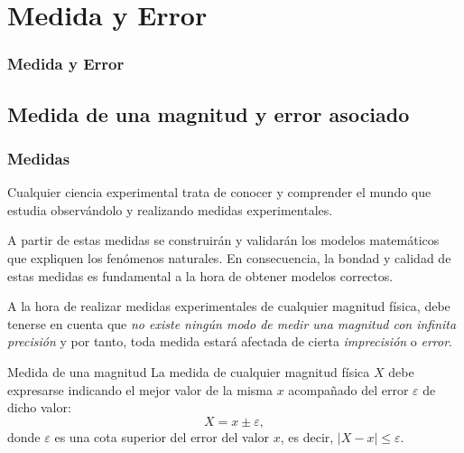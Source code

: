 
\section{Medida y Error}
\begin{frame}
\frametitle{Medida y Error}
\tableofcontents[sectionstyle=show/hide,hideothersubsections]
\end{frame}



\subsection{Medida de una magnitud y error asociado}
\begin{frame}
\frametitle{Medidas}
Cualquier ciencia experimental trata de conocer y comprender el mundo que estudia observándolo y realizando medidas
experimentales.

A partir de estas medidas se construirán y validarán los modelos matemáticos que expliquen los fenómenos naturales. En
consecuencia, la bondad y calidad de estas medidas es fundamental a la hora de obtener modelos correctos.

A la hora de realizar medidas experimentales de cualquier magnitud física, debe tenerse en cuenta que \emph{no existe
ningún modo de medir una magnitud con infinita precisión} y por tanto, toda medida estará afectada de cierta
\emph{imprecisión} o \emph{error}.

\begin{block}{Medida de una magnitud}
La medida de cualquier magnitud física $X$ debe expresarse indicando el mejor valor de la misma $x$ acompañado
del error $\varepsilon$ de dicho valor:
\[
X = x\pm \varepsilon,
\]
donde $\varepsilon$ es una cota superior del error del valor $x$, es decir, $|X-x|\leq \varepsilon$.
\end{block}
\end{frame}


